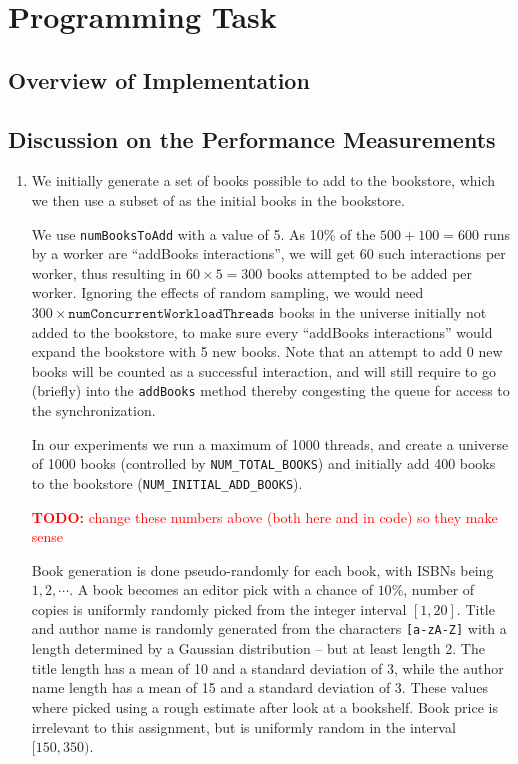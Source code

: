 \documentclass[11pt,a4paper,english]{article}
\newcommand{\todo}[1]{\textcolor{red}{\textbf{TODO: }#1}}
\begin{document}
\begin{enumerate}
\end{enumerate}

\section*{Programming Task}
\subsection*{Overview of Implementation}
\subsection*{Discussion on the Performance Measurements}
\begin{enumerate}
\item We initially generate a set of books possible to add to the bookstore,
  which we then use a subset of as the initial books in the bookstore.

  We use \verb|numBooksToAdd| with a value of 5. As 10\% of the $500+100 = 600$
  runs by a worker are ``addBooks interactions'', we will get $60$ such
  interactions per worker, thus resulting in $60 \times 5 = 300$ books attempted
  to be added per worker. Ignoring the effects of random sampling, we would need
  $300 \times \mathtt{numConcurrentWorkloadThreads}$ books in the universe
  initially not added to the bookstore, to make sure every ``addBooks
  interactions'' would expand the bookstore with 5 new books. Note that an
  attempt to add 0 new books will be counted as a successful interaction, and
  will still require to go (briefly) into the \verb|addBooks| method thereby
  congesting the queue for access to the synchronization.

  In our experiments we run a maximum of 1000 threads, and create a
  universe of 1000 books (controlled by \verb|NUM_TOTAL_BOOKS|) and initially
  add 400 books to the bookstore (\verb|NUM_INITIAL_ADD_BOOKS|).

  \todo{change these numbers above (both here and in code) so they make sense}

  Book generation is done pseudo-randomly for each book, with ISBNs being
  $1,2,\cdots$. A book becomes an editor pick with a chance of $10\%$, number of
  copies is uniformly randomly picked from the integer interval $[1,20]$. Title
  and author name is randomly generated from the characters \verb|[a-zA-Z]| with
  a length determined by a Gaussian distribution -- but at least length 2. The
  title length has a mean of 10 and a standard deviation of 3, while the author
  name length has a mean of 15 and a standard deviation of 3. These values where
  picked using a rough estimate after look at a bookshelf. Book price is
  irrelevant to this assignment, but is uniformly random in the interval
  $[150,350)$.



\end{enumerate}
\end{document}
